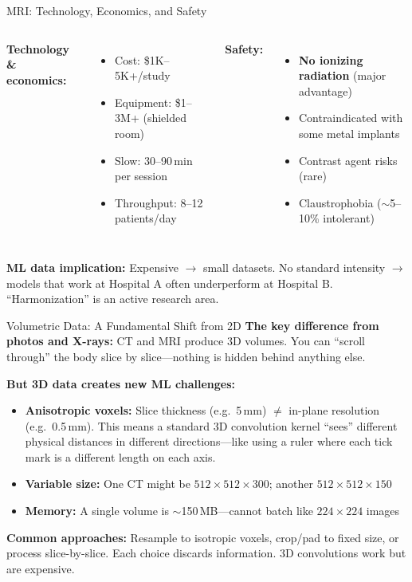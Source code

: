 \documentclass[aspectratio=169,10pt]{beamer}
\begin{document}
\begin{frame}{MRI: Technology, Economics, and Safety}
\begin{columns}[T]
\textbf{Technology \& economics:}
\begin{itemize}
    \item Cost: \$1K--5K+/study
    \item Equipment: \$1--3M+ (shielded room)
    \item Slow: 30--90\,min per session
    \item Throughput: 8--12 patients/day
\end{itemize}

\textbf{Safety:}
\begin{itemize}
    \item \textbf{No ionizing radiation} (major advantage)
    \item Contraindicated with some metal implants
    \item Contrast agent risks (rare)
    \item Claustrophobia ($\sim$5--10\% intolerant)
\end{itemize}
\end{columns}

\vspace{0.3em}
\pause
\textbf{ML data implication:} Expensive $\to$ small datasets. No standard intensity $\to$ models that work at Hospital A often underperform at Hospital B. ``Harmonization'' is an active research area.
\end{frame}

\begin{frame}{Volumetric Data: A Fundamental Shift from 2D}
\textbf{The key difference from photos and X-rays:} CT and MRI produce 3D volumes. You can ``scroll through'' the body slice by slice---nothing is hidden behind anything else.

\vspace{0.3em}
\pause
\textbf{But 3D data creates new ML challenges:}
\begin{itemize}
    \item \textbf{Anisotropic voxels:} Slice thickness (e.g.\ 5\,mm) $\neq$ in-plane resolution (e.g.\ 0.5\,mm). This means a standard 3D convolution kernel ``sees'' different physical distances in different directions---like using a ruler where each tick mark is a different length on each axis.
    \item \textbf{Variable size:} One CT might be $512{\times}512{\times}300$; another $512{\times}512{\times}150$
    \item \textbf{Memory:} A single volume is $\sim$150\,MB---cannot batch like $224{\times}224$ images
\end{itemize}

\vspace{0.2em}
\pause
\textbf{Common approaches:} Resample to isotropic voxels, crop/pad to fixed size, or process slice-by-slice. Each choice discards information. 3D convolutions work but are expensive.

\end{frame}
\end{document}
